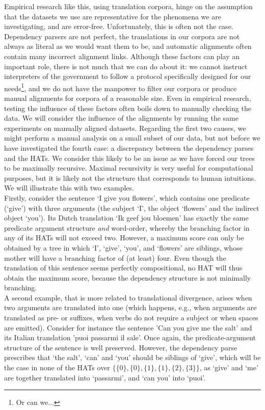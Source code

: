 \documentclass[a4paper, 11pt]{report}
\theoremstyle{definition}
\theoremstyle{plain}
\begin{document}
Empirical research like this, using translation corpora, hinge on the assumption that the datasets we use are representative for the phenomena we are investigating, and are error-free. Unfortunately, this is often not the case. Dependency parsers are not perfect, the translations in our corpora are not always as literal as we would want them to be, and automatic alignments often contain many incorrect alignment links. Although these factors can play an important role, there is not much that we can do about it: we cannot instruct interpreters of the government to follow a protocol specifically designed for our needs\footnote{Or can we...}, and we do not have the manpower to filter our corpora or produce manual alignments for corpora of a reasonable size. Even in empirical research, testing the influence of these factors often boils down to manually checking the data. We will consider the influence of the alignments by running the same experiments on manually aligned datasets. Regarding the first two causes, we might perform a manual analysis on a small subset of our data, but not before we have investigated the fourth case: a discrepancy between the dependency parses and the HATs. We consider this likely to be an issue as we have forced our trees to be maximally recursive. Maximal recursivity is very useful for computational purposes, but it is likely not the structure that corresponds to human intuitions. We will illustrate this with two examples.\\
Firstly, consider the sentence `I give you flowers', which contains one predicate (`give') with three arguments (the subject `I', the object `flowers' and the indirect object `you'). Its Dutch translation `Ik geef jou bloemen' has exactly the same predicate argument structure \textit{and} word-order, whereby the branching factor in any of its HATs will not exceed two. However, a maximum score can only be obtained by a tree in which `I', `give', `you', and `flowers' are siblings, whose mother will have a branching factor of (at least) four. Even though the translation of this sentence seems perfectly compositional, no HAT will thus obtain the maximum score, because the dependency structure is not minimally branching.\\
A second example, that is more related to translational divergence, arises when two arguments are translated into one (which happens, e.g., when arguments are translated as pre- or suffixes, when verbs do not require a subject or when spaces are emitted). Consider for instance the sentence 'Can you give me the salt' and its Italian translation 'puoi passarmi il sale'. Once again, the predicate-argument structure of the sentence is well preserved. However, the dependency parse prescribes that `the salt', `can' and `you' should be siblings of `give', which will be the case in none of the HATs over $\{\{0\},\{0\},\{1\},\{1\},\{2\},\{3\}\}$, as `give' and `me' are together translated into `passarmi', and `can you' into `puoi'.\\
\end{document}
